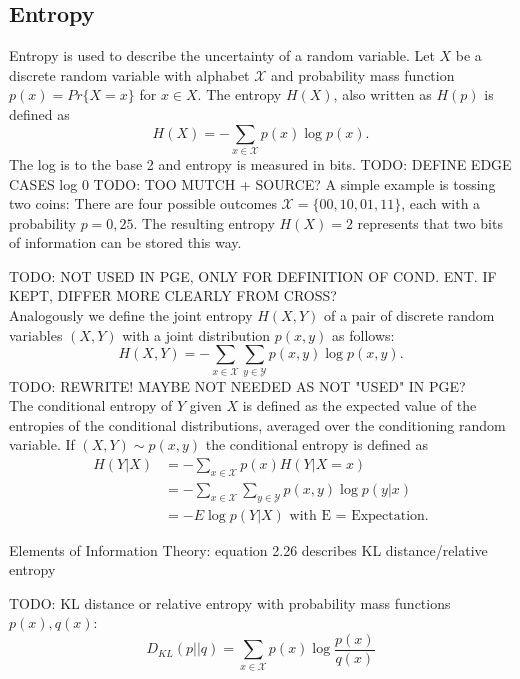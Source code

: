 \subsection{Entropy}
Entropy is used to describe the uncertainty of a random variable. Let $X$ be a discrete random variable with alphabet $\mathcal{X}$ and probability mass function $p(x)=Pr\{X=x\}$ for $x\in X$.
The entropy $H(X)$, also written as $H(p)$ is defined as
\begin{equation}
    H(X) = -\sum_{x \in \mathcal{X}} p(x) \log p(x).
\end{equation}
The log is to the base 2 and entropy is measured in bits. TODO: DEFINE EDGE CASES log 0 TODO: TOO MUTCH + SOURCE? A simple example is tossing two coins: There are four possible outcomes $\mathcal{X}=\{00,10,01,11\}$, each with a probability $p=0,25$. The resulting entropy $H(X)=2$ represents that two bits of information can be stored this way. \bigskip

TODO: NOT USED IN PGE, ONLY FOR DEFINITION OF COND. ENT. IF KEPT, DIFFER MORE CLEARLY FROM CROSS? \\
Analogously we define the joint entropy $H(X,Y)$ of a pair of discrete random variables $(X,Y)$ with a joint distribution $p(x,y)$ as follows:
\begin{equation}
    H(X,Y)=-\sum_{x \in \mathcal{X}} \sum_{y \in \mathcal{Y}} p(x,y) \log p(x,y).
\end{equation}
TODO: REWRITE! MAYBE NOT NEEDED AS NOT "USED" IN PGE? \\
The conditional entropy of $Y$ given $X$ is defined as the expected value of the entropies of the conditional distributions, averaged over the conditioning random variable. If $(X,Y) \sim p(x,y)$ the conditional entropy is defined as
\begin{align}
    H(Y|X)&= -\sum_{x \in \mathcal{X}} p(x) H(Y|X=x) \\
    &= - \sum_{x \in \mathcal{X}} \sum_{y \in \mathcal{Y}}p(x,y) \log p(y|x) \\
    &= -E \log p(Y|X) \text{ with E = Expectation}.
\end{align}

Elements of Information Theory: equation 2.26 describes KL distance/relative entropy \bigskip

TODO: KL distance or relative entropy with probability mass functions $p(x), q(x)$:
\begin{equation}
    D_{KL}(p||q) = \sum_{x \in \mathcal{X}} p(x)\log \frac{p(x)}{q(x)}
\end{equation}

